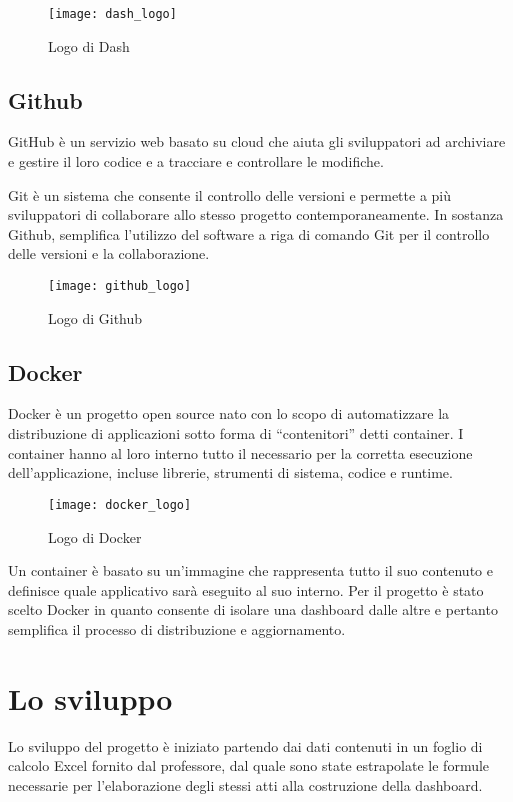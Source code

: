 \begin{figure}[htp]
    \centering
    \texttt{[image: dash\_logo]}
    \caption{Logo di Dash}
\end{figure}


\subsection{Github}
GitHub è un servizio web basato su cloud che aiuta gli sviluppatori ad archiviare e gestire il loro codice e a tracciare e controllare le modifiche.

Git è un sistema che consente il controllo delle versioni e permette a più sviluppatori di collaborare allo stesso progetto contemporaneamente.
In sostanza Github, semplifica l’utilizzo del software a riga di comando Git per il controllo delle versioni e la collaborazione.

\begin{figure}[htp]
    \centering
    \texttt{[image: github\_logo]}
    \caption{Logo di Github}
\end{figure}

\subsection{Docker}
Docker è un progetto open source nato con lo scopo di automatizzare la distribuzione di applicazioni sotto forma di “contenitori” detti container.
I container hanno al loro interno tutto il necessario per la corretta esecuzione dell’applicazione, incluse librerie, strumenti di sistema, codice e runtime.

\begin{figure}[htp]
    \centering
    \texttt{[image: docker\_logo]}
    \caption{Logo di Docker}
\end{figure}

Un container è basato su un’immagine che rappresenta tutto il suo contenuto e definisce quale applicativo sarà eseguito al suo interno. 
Per il progetto è stato scelto Docker in quanto consente di isolare una dashboard dalle altre e pertanto semplifica il processo di distribuzione e aggiornamento.

\section{Lo sviluppo}
Lo sviluppo del progetto è iniziato partendo dai dati contenuti in un foglio di calcolo Excel fornito dal professore, dal quale sono state estrapolate le formule necessarie per l’elaborazione degli stessi atti alla costruzione della dashboard.

